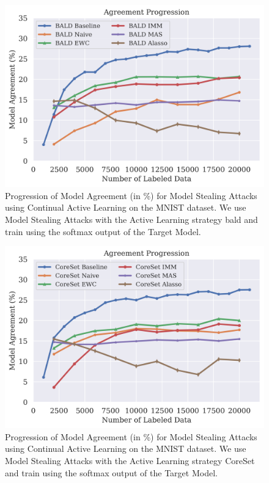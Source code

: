 \begin{figure}[h]
    \centering
    \includegraphics[width=0.7\linewidth]{images/results_CALMS/cifar100_softmax_bald.png}
    \caption[Agreement Comparison for Model Stealing on CIFAR100 using the softmax output and the Active Learning strategy BALD]{Progression of Model Agreement
    (in \%) for Model Stealing Attacks using Continual Active Learning on the MNIST dataset. We use Model Stealing Attacks with the Active Learning strategy
    \gls{bald} and train using the softmax output of the Target Model.}
    \label{fig:CALMSCIFAR100SoftmaxBALD}
\end{figure}

\begin{figure}[h]
    \centering
    \includegraphics[width=0.7\linewidth]{images/results_CALMS/cifar100_softmax_coreset.png}
    \caption[Agreement Comparison for Model Stealing on CIFAR100 using the softmax output and the Active Learning strategy CoreSet]{Progression of Model Agreement
    (in \%) for Model Stealing Attacks using Continual Active Learning on the MNIST dataset. We use Model Stealing Attacks with the Active Learning strategy
    CoreSet and train using the softmax output of the Target Model.}
    \label{fig:CALMSCIFAR100SoftmaxCoreSet}
\end{figure}

